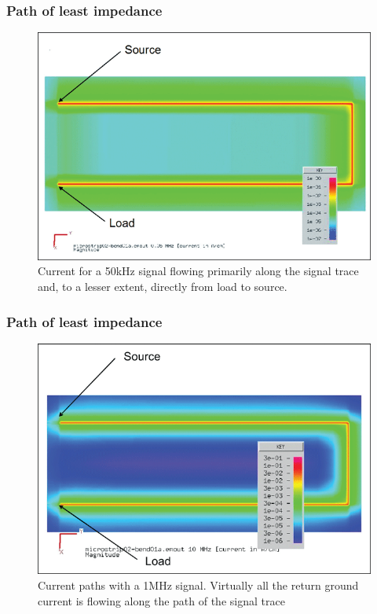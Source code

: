 \documentclass[t]{beamer}
\begin{document}
\begin{frame}
	\frametitle{Path of least impedance}
	\begin{figure}
		\includegraphics[width=0.8\linewidth]{50khz.png}
		\caption{Current for a 50kHz signal flowing primarily along the signal trace and, to a lesser extent, directly from load to source.}
	\end{figure}
\end{frame}
\begin{frame}
	\frametitle{Path of least impedance}
	\begin{figure}
		\includegraphics[width=0.8\linewidth]{1mhz.png}
		\caption{Current paths with a 1MHz signal. Virtually all the return ground current is flowing along the path of the signal trace}
	\end{figure}
\end{frame}
\end{document}
